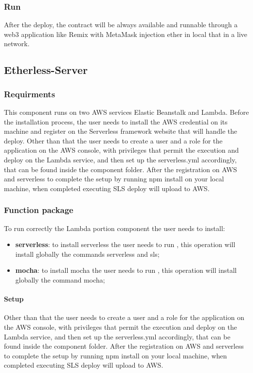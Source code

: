 \subsubsection{Run}
After the deploy, the contract will be always available and runnable through a web3 application like Remix with MetaMask injection ether in local that in a live network.
\subsection{Etherless-Server}
\subsubsection{Requirments}
This component runs on two AWS services Elastic Beanstalk and Lambda.
Before the installation process, the user needs to install the AWS credential on its
machine and register on the Serverless framework website that will handle the deploy.
Other than that the user needs to create a user and a role for the application on the AWS console,
with privileges that permit the execution and deploy on the Lambda service, and then set up the serverless.yml accordingly,
that can be found inside the component folder.
After the registration on AWS and serverless to complete the setup by running npm install on your local machine, when completed executing SLS deploy will upload to AWS.
\subsubsection{Function package}
To run correctly the Lambda portion component the user needs to install:
\begin{itemize}
    \item \textbf{serverless}: to install serverless the user needs to run , this operation will install globally the commands serverless and sls;
    \item \textbf{mocha}: to install mocha the user needs to run , this operation will install globally the command mocha;
\end{itemize}
\paragraph{Setup}
Other than that the user needs to create a user and a role for the application on the AWS console,
with privileges that permit the execution and deploy on the Lambda service, and then set up the serverless.yml accordingly,
that can be found inside the component folder.
After the registration on AWS and serverless to complete the setup by running npm install on your local machine, when completed executing SLS deploy will upload to AWS.
